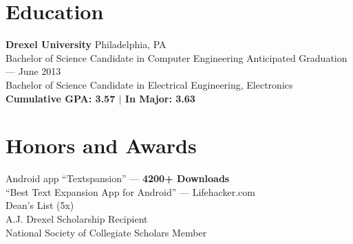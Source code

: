 \documentclass[10pt]{barag_resume}
\author{Sean Barag}
\begin{document}
	\section{Education}%
		\textbf{Drexel University} \hfill Philadelphia, PA\\
		Bachelor of Science Candidate in Computer Engineering \hfill Anticipated Graduation --- June 2013\\
		Bachelor of Science Candidate in Electrical Engineering, Electronics\\
		\textbf{Cumulative GPA: 3.57 $|$ In Major: 3.63}


	\section{Honors and Awards}%
		Android app ``Textspansion'' --- \textbf{4200+ Downloads}\\ {\setlength{\parindent}{1em}
			\indent ``Best Text Expansion App for Android'' --- Lifehacker.com\\
		Dean's List (5x)\\
		A.J. Drexel Scholarship Recipient\\
		National Society of Collegiate Scholars Member}
\end{document}
